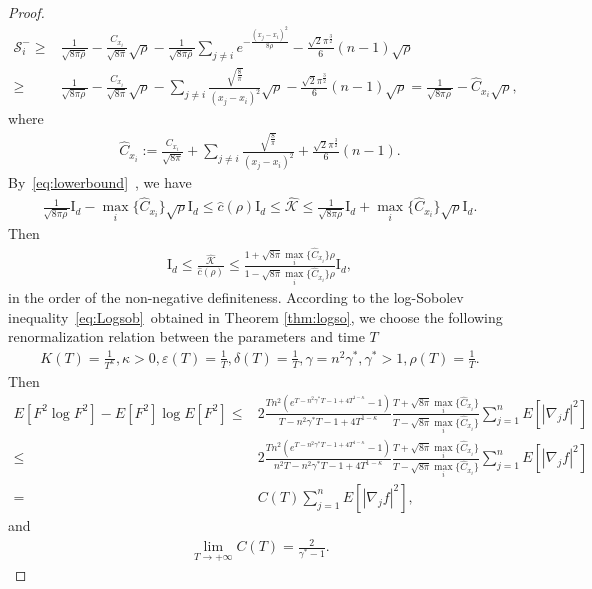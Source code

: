 \documentclass[11pt]{article}
\numberwithin{equation}{section}%
\numberwithin{figure}{section}%
\theoremstyle{remark}
\begin{document}
\begin{proof}
\begin{align*}
			\mathcal{S}^{-}_{i}\geq&\frac{1}{\sqrt{8\pi\rho}}-\frac{C_{x_{i}}}{\sqrt{8\pi}}\sqrt{\rho}-\frac{1}{\sqrt{8\pi\rho}}\sum_{j\neq i}e^{-\frac{(x_{j}-x_{i})^{2}}{8\rho}}-\frac{\sqrt{2}\pi^{\frac{3}{2}}}{6}(n-1)\sqrt{\rho}\\
			\geq&\frac{1}{\sqrt{8\pi\rho}}-\frac{C_{x_{i}}}{\sqrt{8\pi}}\sqrt{\rho}-\sum_{j\neq i}\frac{\sqrt{\frac{8}{\pi}}}{(x_{j}-x_{i})^{2}}\sqrt{\rho}-\frac{\sqrt{2}\pi^{\frac{3}{2}}}{6}(n-1)\sqrt{\rho}=\frac{1}{\sqrt{8\pi\rho}}-\hat{C}_{x_{i}}\sqrt{\rho},
		\end{align*}	
		where
		\begin{align}\label{eq:hatc}
			\hat{C}_{x_{i}}:=\frac{C_{x_{i}}}{\sqrt{8\pi}}+\sum_{j\neq i}\frac{\sqrt{\frac{8}{\pi}}}{(x_{j}-x_{i})^{2}}+\frac{\sqrt{2}\pi^{\frac{3}{2}}}{6}(n-1).
		\end{align}	
		By~\eqref{eq:lowerbound}~, we have
			\begin{align}\label{eq:uplower}
		\frac{1}{\sqrt{8\pi\rho}}\text{I}_{d}- \max_{i}\{\hat{C}_{x_{i}}\}\sqrt{\rho}\text{I}_{d}	\leq\hat{c}(\rho)\text{I}_{d}\leq\hat{\mathcal{K}}\leq\frac{1}{\sqrt{8\pi\rho}}\text{I}_{d}+ \max_{i}\{\hat{C}_{x_{i}}\}\sqrt{\rho}\text{I}_{d}.
		\end{align}
		Then 
			\begin{align*}
			\text{I}_{d}\leq\frac{\hat{\mathcal{K}}}{\hat{c}(\rho)}\leq\frac{1+\sqrt{8\pi} \max_{i}\{\hat{C}_{x_{i}}\}\rho}{1-\sqrt{8\pi} \max_{i}\{\hat{C}_{x_{i}}\}\rho}\text{I}_{d},
		\end{align*}
in the order of the non-negative definiteness. According to the log-Sobolev inequality~\eqref{eq:Logsob}~obtained in Theorem \ref{thm:logso}, we choose the following renormalization relation between the parameters and time $T$
	\begin{align*}
			K(T)=\frac{1}{T^{\kappa}},\kappa>0,\varepsilon(T)=\frac{1}{T},\delta(T)=\frac{1}{T},\gamma=n^{2}\gamma^{*},\gamma^{*}>1, \rho(T)=\frac{1}{T}.
	\end{align*}
	Then
	\begin{align*}
	E[F^{2}\log F^{2}]-E[F^{2}]\log E[F^{2}]
	\leq&2\frac{Tn^{2}\left(e^{T-n^{2}\gamma^{*}T-1+4T^{1-\kappa}}-1\right)}{T-n^{2}\gamma^{*}T-1+4T^{1-\kappa}}\frac{T+\sqrt{8\pi} \max_{i}\{\hat{C}_{x_{i}}\}}{T-\sqrt{8\pi} \max_{i}\{\hat{C}_{x_{i}}\}}\sum_{j=1}^nE\left[|\nabla_j f|^{2} \right]\\
	\leq&2\frac{Tn^{2}\left(e^{T-n^{2}\gamma^{*}T-1+4T^{1-\kappa}}-1\right)}{n^{2}T-n^{2}\gamma^{*}T-1+4T^{1-\kappa}}\frac{T+\sqrt{8\pi} \max_{i}\{\hat{C}_{x_{i}}\}}{T-\sqrt{8\pi} \max_{i}\{\hat{C}_{x_{i}}\}}\sum_{j=1}^nE\left[|\nabla_j f|^{2}\right]\\
	=&C(T) \sum_{j=1}^nE\left[|\nabla_j f|^{2} \right],
\end{align*}
and 
\begin{align*}
	\lim\limits_{T\rightarrow+\infty}C(T)=\frac{2}{\gamma^{*}-1}.
\end{align*}
    \end{proof}	
\end{document}
